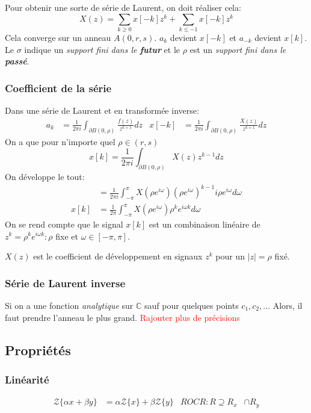 \documentclass{report}
\begin{document}
Pour obtenir une sorte de série de Laurent, on doit réaliser cela:
\begin{equation}
X(z) = \sum_{k \geqslant 0} x[-k]z^k + \sum_{k \leqslant -1} x[-k] z^k
\end{equation}
Cela converge sur un anneau $A(0, r, s)$. $a_k$ devient $x[-k]$ et $a_{-k}$ devient $x[k]$. Le $\sigma$ indique un \textit{support fini dans le \textbf{futur}} et le $\rho$ est un \textit{support fini dans le \textbf{passé}}.

\subsubsection{Coefficient de la série}
Dans une série de Laurent et en transformée inverse:
\begin{align*}
a_k &= \frac{1}{2 \pi i} \int_{\partial B(0, \rho)} \frac{f(z)}{z^{k+1}} dz & x[-k] &= \frac{1}{2 \pi i} \int_{\partial B(0, \rho)} \frac{X(z)}{z^{k+1}} dz
\end{align*}
On a que pour n'importe quel $\rho \in (r,s)$
\begin{equation}
x[k] = \frac{1}{2 \pi i} \int_{\partial B(0, \rho)}X(z)z^{k-1} dz 
\end{equation}
On développe le tout:
\begin{align*}
& = \frac{1}{2 \pi i} \int_{- \pi}^{\pi} X(\rho e^{i \omega})(\rho e^{i \omega})^{k-1} i \rho e^{i \omega} d\omega\\
x[k] &= \frac{1}{2 \pi} \int_{- \pi}^{\pi} X(\rho e^{i \omega})\rho^k e^{i \omega k} d\omega
\end{align*}
On se rend compte que le signal $x[k]$ est un combinaison linéaire de $z^k = \rho^k e^{i \omega k} : \rho$ fixe et $\omega \in [-\pi, \pi]$. \par
$X(z)$ est le coefficient de développement en signaux $z^k$ pour un $|z| = \rho$ fixé.

\subsubsection{Série de Laurent inverse} 
Si on a une fonction \textit{analytique} sur $\mathbb{C}$ sauf pour quelques points $c_1, c_2, ...$ Alors, il faut prendre l'anneau le plus grand.
\textcolor{red}{Rajouter plus de précisions}

\subsection{Propriétés}
\subsubsection{Linéarité}
\begin{align*}
\mathcal{Z}\{\alpha x + \beta y \} &= \alpha \mathcal{Z}\{x\} + \beta \mathcal{Z}\{y\} & ROC R: R \supseteq R_x &\cap R_y
\end{align*}
\end{document}

